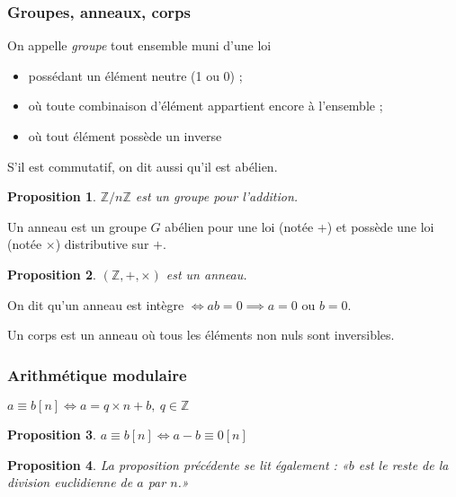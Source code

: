 \documentclass[french]{beamer}
\newtheorem{proposition}{Proposition}
\newcommand{\Z}{\mathbb{Z}}
\begin{document}
\begin{frame}[allowframebreaks]
  \frametitle{Groupes, anneaux, corps}
  \begin{definition}
    On appelle \emph{groupe} tout ensemble muni d'une loi
    \begin{itemize}
      \item possédant un élément neutre (1 ou 0) ;
      \item où toute combinaison d'élément appartient encore à
        l'ensemble ;
      \item où tout élément possède un inverse
    \end{itemize}
    S'il est commutatif, on dit aussi qu'il est abélien.
  \end{definition}
  \begin{proposition}
    $\Z/n\Z$ est un groupe pour l'addition.
  \end{proposition}
  \framebreak
  \begin{definition}[anneau]
    Un anneau est un groupe $G$ abélien pour une loi (notée +) et
    possède une loi (notée $\times$) distributive sur $+$.
  \end{definition}
  \begin{proposition}
    $(\Z,+,\times)$ est un anneau.
  \end{proposition}
  \begin{definition}[intègre]
    On dit qu'un anneau est intègre $\iff ab = 0 \implies a = 0$ ou $b =
    0$.
  \end{definition}
  \begin{definition}[corps]
    Un corps est un anneau où tous les éléments non nuls sont
    inversibles.
  \end{definition}
\end{frame}

\begin{frame}
  \frametitle{Arithmétique modulaire}
  \begin{definition}
    $a \equiv b [n] \iff a = q\times n + b,\ q\in\Z $
  \end{definition}
  \begin{proposition}
    $a \equiv b [n] \iff a - b \equiv 0 [n] $
  \end{proposition}
  \begin{proposition}
    La proposition précédente se lit également : «$b$ est le reste de
    la division euclidienne de $a$ par $n$.»
  \end{proposition}
\end{frame}
\end{document}
